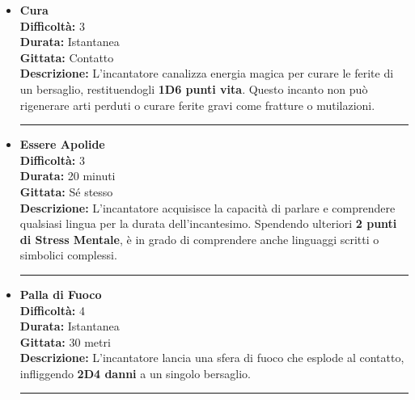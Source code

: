 \documentclass[./magie.tex]{subfiles}
\begin{document}
\begin{itemize}

\item \textbf{Cura} \\
\textbf{Difficoltà:} 3 \\
\textbf{Durata:} Istantanea \\
\textbf{Gittata:} Contatto \\
\textbf{Descrizione:} L'incantatore canalizza energia magica per curare le ferite di un bersaglio, restituendogli \textbf{1D6 punti vita}. Questo incanto non può rigenerare arti perduti o curare ferite gravi come fratture o mutilazioni.

\vspace{0.2cm}
\noindent
\begin{center}
\rule{\textwidth}{0.4pt} 
\end{center}
\vspace{0.2cm}

\item \textbf{Essere Apolide} \\
\textbf{Difficoltà:} 3 \\
\textbf{Durata:} 20 minuti \\
\textbf{Gittata:} Sé stesso \\
\textbf{Descrizione:} L'incantatore acquisisce la capacità di parlare e comprendere qualsiasi lingua per la durata dell'incantesimo. Spendendo ulteriori \textbf{2 punti di Stress Mentale}, è in grado di comprendere anche linguaggi scritti o simbolici complessi.

\vspace{0.2cm}
\noindent
\begin{center}
\rule{\textwidth}{0.4pt} 
\end{center}
\vspace{0.2cm}

\item \textbf{Palla di Fuoco} \\
\textbf{Difficoltà:} 4 \\
\textbf{Durata:} Istantanea \\
\textbf{Gittata:} 30 metri \\
\textbf{Descrizione:} L'incantatore lancia una sfera di fuoco che esplode al contatto, infliggendo \textbf{2D4 danni} a un singolo bersaglio.

\vspace{0.2cm}
\noindent
\begin{center}
\rule{\textwidth}{0.4pt} 
\end{center}
\vspace{0.2cm}


\end{itemize}
\end{document}
